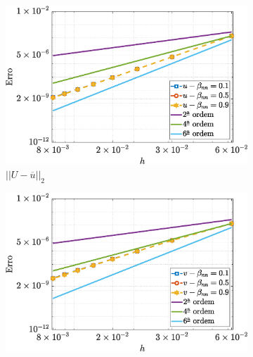 \begin{figure}[H] 
    \centering
    \caption{Erro para o campo de velocidade $(\overline{u},\tilde{v})$, vorticidade $(\tilde{\omega_{z}})$ e função de corrente $(\tilde{\psi})$, considerando $Re=100$, $Wi=1$ e $\alpha_G=0.1$, para o escoamento de fluido viscoelástico com o modelo Giesekus}\label{GEerror011}
    \begin{subfigure}[b]{.47\textwidth}
        \includegraphics[width=\textwidth]{figures/Case12/Giesekus/Errors/NormErr_2nd_Re_100_Wi_1_epsilon_0_xi_0_alphaG_0.1_Dt_1e-06_at_0.05_tipsim_1_MMS_12_U.eps}
        \caption{$||U - \overline{u}||_{2}$}
        \label{error_u_2nd_Case1_giesekus_alphaG_0.1}
    \end{subfigure}
    \vspace{0.2cm}
    \qquad
    \begin{subfigure}[b]{.47\textwidth}
        \includegraphics[width=\textwidth]{figures/Case12/Giesekus/Errors/NormErr_2nd_Re_100_Wi_1_epsilon_0_xi_0_alphaG_0.1_Dt_1e-06_at_0.05_tipsim_1_MMS_12_V.eps}

\end{subfigure}
\end{figure}
